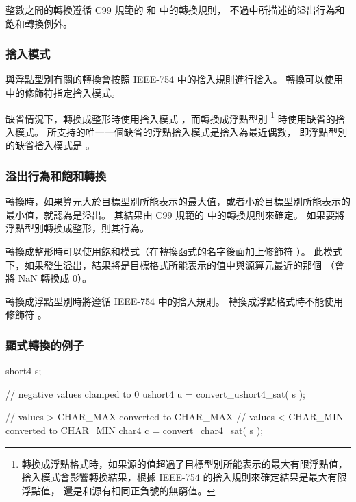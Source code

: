 整數之間的轉換遵循 C99 規範的{} 和{} 中的轉換規則，
不過中所描述的溢出行為和飽和轉換例外。

\subsubsection{捨入模式}

與浮點型別有關的轉換會按照 IEEE-754 中的捨入規則進行捨入。
轉換可以使用中的修飾符指定捨入模式。

{}

缺省情況下，轉換成整形時使用捨入模式 ，而轉換成浮點型別
\footnote{轉換成浮點格式時，如果源的值超過了目標型別所能表示的最大有限浮點值，
捨入模式會影響轉換結果，根據 IEEE-754 的捨入規則來確定結果是最大有限浮點值，
還是和源有相同正負號的無窮值。}
時使用缺省的捨入模式。
所支持的唯一一個缺省的浮點捨入模式是捨入為最近偶數，
即浮點型別的缺省捨入模式是 。

\subsubsection[sec:oorbasc]{溢出行為和飽和轉換}

轉換時，如果算元大於目標型別所能表示的最大值，或者小於目標型別所能表示的最小值，就認為是溢出。
其結果由 C99 規範的{} 中的轉換規則來確定。
如果要將浮點型別轉換成整形，則其行為。

轉換成整形時可以使用飽和模式（在轉換函式的名字後面加上修飾符 ）。
此模式下，如果發生溢出，結果將是目標格式所能表示的值中與源算元最近的那個
（會將 NaN 轉換成 0）。

轉換成浮點型別時將遵循 IEEE-754 中的捨入規則。
轉換成浮點格式時不能使用修飾符 。

\subsubsection{顯式轉換的例子}

\startexample
\startclc
short4	s;

// negative values clamped to 0
ushort4	u = convert_ushort4_sat( s );

// values > CHAR_MAX converted to CHAR_MAX
// values < CHAR_MIN converted to CHAR_MIN
char4 c = convert_char4_sat( s );
\stopclc
\stopexample

